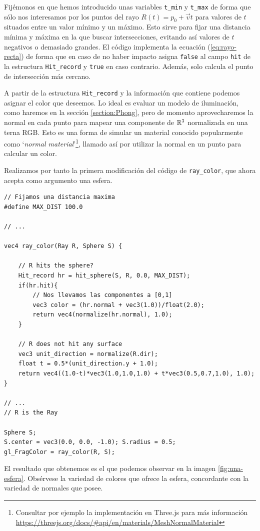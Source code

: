 Fijémonos en que hemos introducido unas variables \verb|t_min| y \verb|t_max| de forma que sólo nos interesamos por los puntos del rayo $R(t)=p_0+\vec vt$ para valores de $t$ situados entre un valor mínimo y un máximo. Esto sirve para fijar una distancia mínima y máxima en la que buscar intersecciones, evitando así valores de $t$ negativos o demasiado grandes. El código implementa la ecuación (\ref{eq:rayo-recta}) de forma que en caso de no haber impacto asigna \verb|false| al campo \verb|hit| de la estructura \verb|Hit_record| y \verb|true| en caso contrario. Además, solo calcula el punto de intersección más cercano.

A partir de la estructura \verb|Hit_record| y la información que contiene podemos asignar el color que deseemos. Lo ideal es evaluar un modelo de iluminación, como haremos en la sección \ref{section:Phong}, pero de momento aprovecharemos la normal en cada punto para mapear una componente de $\mathbb{R}^3$ normalizada en una terna RGB. Esto es una forma de simular un material conocido popularmente como `\textit{normal material}'\footnote{Consultar por ejemplo la implementación en Three.js para más información \url{https://threejs.org/docs/\#api/en/materials/MeshNormalMaterial}}, llamado así por utilizar la normal en un punto para calcular un color.

Realizamos por tanto la primera modificación del código de \verb|ray_color|, que ahora acepta como argumento una esfera.

\begin{lstlisting}
// Fijamos una distancia maxima
#define MAX_DIST 100.0

// ... 

vec4 ray_color(Ray R, Sphere S) {

    // R hits the sphere?
    Hit_record hr = hit_sphere(S, R, 0.0, MAX_DIST);
    if(hr.hit){
        // Nos llevamos las componentes a [0,1]
        vec3 color = (hr.normal + vec3(1.0))/float(2.0);
        return vec4(normalize(hr.normal), 1.0);
    }

    // R does not hit any surface
    vec3 unit_direction = normalize(R.dir);
    float t = 0.5*(unit_direction.y + 1.0);
    return vec4((1.0-t)*vec3(1.0,1.0,1.0) + t*vec3(0.5,0.7,1.0), 1.0);
}

// ... 
// R is the Ray

Sphere S; 
S.center = vec3(0.0, 0.0, -1.0); S.radius = 0.5;
gl_FragColor = ray_color(R, S);
\end{lstlisting}

El resultado que obtenemos es el que podemos observar en la imagen \ref{fig:una-esfera}. Obsérvese la variedad de colores que ofrece la esfera, concordante con la variedad de normales que posee.


